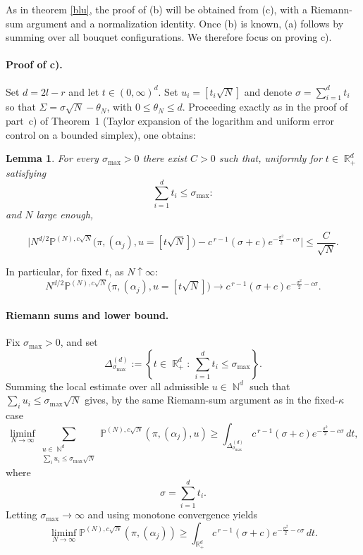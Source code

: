 \documentclass[11pt]{article}
\DeclareMathOperator{\NN}{\mathbb{N}}
\DeclareMathOperator{\RR}{\mathbb{R}}
\newtheorem{lemma}{Lemma}[section]
\begin{document}
 As in theorem \ref{blu}, the proof of (b) will be obtained from (c), 
with a Riemann-sum argument and a normalization identity. Once (b)
is known, (a) follows by summing over all bouquet configurations. We therefore focus on proving c).
 \noindent
\paragraph{Proof of c).}
Set $d=2l-r$ and let $t\in (0,\infty)^d$. Set $u_i=[t_i\sqrt N]$ and denote $\sigma=\sum_{i=1}^d t_i$ so that
$\Sigma=\sigma\sqrt N-\theta_N$, with $0\leq \theta_N\le d$.
Proceeding exactly as in the proof of part~c) of Theorem~1
(Taylor expansion of the logarithm and uniform error control on a  bounded
simplex), one obtains:

\begin{lemma}
For every $\sigma_{\max}>0$ there exist $C>0$  such that, uniformly for \(t\in\RR_+^d\) satisfying
\[
\sum_{i=1}^d t_i\le \sigma_{\max}:
\] and $N$ large enough,

\[
\Bigg|
N^{d/2}
\mathbb P^{(N),c\sqrt N}
\bigl(\pi,(\alpha_j),u=[t\sqrt N]\bigr)
-
c^{\,r-1}(\sigma+c)
e^{-\frac{\sigma^2}{2}-c\sigma}
\Bigg|
\le \frac{C}{\sqrt N}.
\]
\end{lemma}
\medskip
\noindent
In particular, for fixed $t$, as $N\uparrow\infty$:
\begin{equation}\label{eq:pointwise-limit}
N^{d/2}
\mathbb P^{(N),c\sqrt N}
\bigl(\pi,(\alpha_j),u=[t\sqrt N]\bigr)
\longrightarrow
c^{\,r-1}(\sigma+c)
e^{-\frac{\sigma^2}{2}-c\sigma}.
\end{equation}

\paragraph{Riemann sums and lower bound.}
Fix \(\sigma_{\max}>0\), and set
\[
\Delta_{\sigma_{\max}}^{(d)}
:=
\left\{
t\in\RR_+^d:\ \sum_{i=1}^d t_i\le \sigma_{\max}
\right\}.
\]
Summing the local estimate over all admissible
\(u\in\NN^d\) such that \(\sum_i u_i\le\sigma_{\max}\sqrt N\) gives, by the same Riemann-sum argument as in the fixed-$\kappa$ case
\[
\liminf_{N\to\infty}
\sum_{\substack{u\in\NN^d\\ \sum_i u_i\le \sigma_{\max}\sqrt N}}
\mathbb P^{(N),c\sqrt N}
(\pi,(\alpha_j),u)
\ge
\int_{\Delta_{\sigma_{\max}}^{(d)}}
c^{\,r-1}(\sigma+c)
e^{-\frac{\sigma^2}{2}-c\sigma}
\,dt,
\]
where
\[
\sigma=\sum_{i=1}^d t_i.
\]
Letting \(\sigma_{\max}\to\infty\) and using monotone convergence yields
\[
\liminf_{N\to\infty}
\mathbb P^{(N),c\sqrt N}
(\pi,(\alpha_j))
\ge
\int_{\RR_+^d}
c^{\,r-1}(\sigma+c)
e^{-\frac{\sigma^2}{2}-c\sigma}
\,dt .
\]
\end{document}

